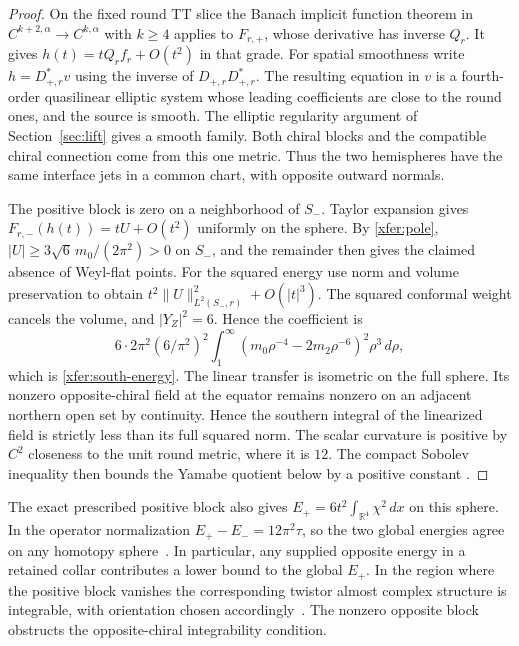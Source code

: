 \documentclass[11pt]{article}
\numberwithin{equation}{section}
\theoremstyle{definition}
\theoremstyle{remark}
\begin{document}
\begin{proof}
On the fixed round TT slice the Banach implicit function theorem
in \(C^{k+2,\alpha}\to C^{k,\alpha}\) with \(k\ge4\) applies to
\(F_{r,+}\), whose derivative has inverse \(Q_r\). It gives
\(h(t)=tQ_rf_r+O(t^2)\) in that grade. For spatial smoothness
write \(h=D_{+,r}^*v\) using the inverse of
\(D_{+,r}D_{+,r}^*\). The resulting equation in \(v\) is a
fourth-order quasilinear elliptic system whose leading coefficients
are close to the round ones, and the source is smooth.
The elliptic regularity argument of Section~\ref{sec:lift}
gives a smooth family. Both chiral blocks and the compatible
chiral connection come from this one metric. Thus the two
hemispheres have the same interface jets in a common chart,
with opposite outward normals.

The positive block is zero on a neighborhood of \(S_-\).
Taylor expansion gives \(F_{r,-}(h(t))=tU+O(t^2)\)
uniformly on the sphere. By \eqref{xfer:pole},
\(|U|\ge 3\sqrt6\,m_0/(2\pi^2)>0\) on \(S_-\), and the
remainder then gives the claimed absence of Weyl-flat points.
For the squared energy use norm and volume preservation to
obtain \(t^2\|U\|_{L^2(S_-,r)}^2+O(|t|^3)\).
The squared conformal weight cancels the volume,
and \(|Y_Z|^2=6\). Hence the coefficient is
\[
 6\cdot2\pi^2(6/\pi^2)^2
 \int_1^\infty (m_0\rho^{-4}-2m_2\rho^{-6})^2\rho^3\,d\rho ,
\]
which is \eqref{xfer:south-energy}. The linear transfer is isometric on the full sphere. Its nonzero
opposite-chiral field at the equator remains nonzero on an adjacent
northern open set by continuity. Hence the southern integral of the
linearized field is strictly less than its full squared norm.
The scalar curvature
is positive by \(C^2\) closeness to the unit round metric,
where it is \(12\). The compact Sobolev inequality then bounds
the Yamabe quotient below by a positive constant
\cite[Remark~1]{ChangGurskyYang2003}.
\end{proof}

The exact prescribed positive block also gives
\(E_+=6t^2\int_{\mathbb R^4}\chi^2\,dx\) on this sphere.
In the operator normalization \(E_+-E_-=12\pi^2\tau\), so the two
global energies agree on any homotopy sphere~\cite{Hirzebruch1971Signature}.
In particular, any supplied opposite energy in a retained collar
contributes a lower bound to the global \(E_+\). In the region
where the positive block vanishes the corresponding twistor
almost complex structure is integrable, with orientation chosen
accordingly~\cite[Theorem~4.1]{AHS1978}. The nonzero opposite
block obstructs the opposite-chiral integrability condition.
\end{document}
